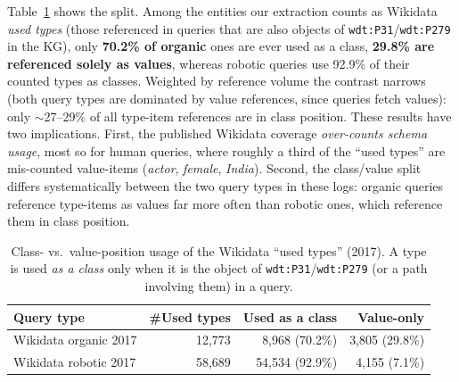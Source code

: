 \documentclass[sw]{iosart2x}
\begin{document}
Table~\ref{tab:classvalue} shows the split. Among the entities our extraction counts as Wikidata \emph{used types} (those referenced in queries that are also objects of \texttt{wdt:P31}/\texttt{wdt:P279} in the KG), only \textbf{70.2\% of organic} ones are ever used as a class, \textbf{29.8\% are referenced solely as values}, whereas robotic queries use 92.9\% of their counted types as classes. Weighted by reference volume the contrast narrows (both query types are dominated by value references, since queries fetch values): only $\sim$27--29\% of all type-item references are in class position. These results have two implications. First, the published Wikidata coverage \emph{over-counts schema usage}, most so for human queries, where roughly a third of the ``used types'' are mis-counted value-items (\emph{actor}, \emph{female}, \emph{India}). Second, the class/value split differs systematically between the two query types in these logs: organic queries reference type-items as values far more often than robotic ones, which reference them in class position. 


\begin{table}[ht]
\centering
\caption{Class- vs.\ value-position usage of the Wikidata ``used types'' (2017). A type is used \emph{as a class} only when it is the object of \texttt{wdt:P31}/\texttt{wdt:P279} (or a path involving them) in a query.}
\label{tab:classvalue}
\begin{tabular}{l|r|r|r}
\hline
Query type & \#Used types & Used as a class & Value-only \\
\hline
Wikidata organic 2017 & 12,773 & 8,968 (70.2\%) & 3,805 (29.8\%) \\
Wikidata robotic 2017 & 58,689 & 54,534 (92.9\%) & 4,155 (7.1\%) \\
\hline
\end{tabular}
\end{table}
\end{document}
